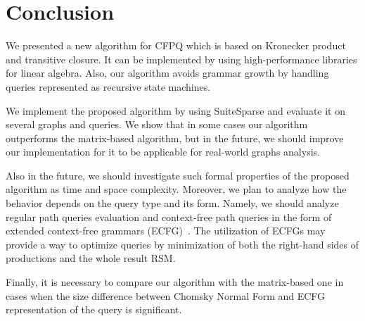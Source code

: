 \section{Conclusion}

We presented a new algorithm for CFPQ which is based on Kronecker product and transitive closure.
It can be implemented by using high-performance libraries for linear algebra.
Also, our algorithm avoids grammar growth by handling queries represented as recursive state machines.

We implement the proposed algorithm by using SuiteSparse and evaluate it on several graphs and queries.
We show that in some cases our algorithm outperforms the matrix-based algorithm, but in the future, we should improve our implementation for it to be applicable for real-world graphs analysis.

Also in the future, we should investigate such formal properties of the proposed algorithm as time and space complexity.
Moreover, we plan to analyze how the behavior depends on the query type and its form.
Namely, we should analyze regular path queries evaluation and context-free path queries in the form of extended context-free grammars (ECFG)~\cite{10.1007/978-3-642-00982-2_35}.
The utilization of ECFGs may provide a way to optimize queries by minimization of both the right-hand sides of productions and the whole result RSM.

Finally, it is necessary to compare our algorithm with the matrix-based one in cases when the size difference between Chomsky Normal Form and ECFG representation of the query is significant.